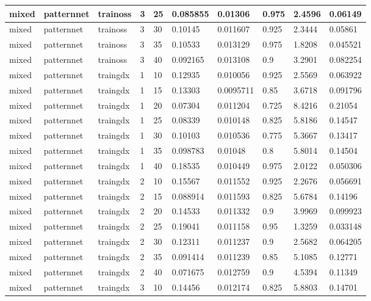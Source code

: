 \begin{longtable}{lllllllll}
mixed & patternnet & trainoss & 3 & 25 & 0.085855 & 0.01306 & 0.975 & 2.4596 & 0.06149 \\ \hline 
mixed & patternnet & trainoss & 3 & 30 & 0.10145 & 0.011607 & 0.925 & 2.3444 & 0.05861 \\ \hline 
mixed & patternnet & trainoss & 3 & 35 & 0.10533 & 0.013129 & 0.975 & 1.8208 & 0.045521 \\ \hline 
mixed & patternnet & trainoss & 3 & 40 & 0.092165 & 0.013108 & 0.9 & 3.2901 & 0.082254 \\ \hline 
mixed & patternnet & traingdx & 1 & 10 & 0.12935 & 0.010056 & 0.925 & 2.5569 & 0.063922 \\ \hline 
mixed & patternnet & traingdx & 1 & 15 & 0.13303 & 0.0095711 & 0.85 & 3.6718 & 0.091796 \\ \hline 
mixed & patternnet & traingdx & 1 & 20 & 0.07304 & 0.011204 & 0.725 & 8.4216 & 0.21054 \\ \hline 
mixed & patternnet & traingdx & 1 & 25 & 0.08339 & 0.010148 & 0.825 & 5.8186 & 0.14547 \\ \hline 
mixed & patternnet & traingdx & 1 & 30 & 0.10103 & 0.010536 & 0.775 & 5.3667 & 0.13417 \\ \hline 
mixed & patternnet & traingdx & 1 & 35 & 0.098783 & 0.01048 & 0.8 & 5.8014 & 0.14504 \\ \hline 
mixed & patternnet & traingdx & 1 & 40 & 0.18535 & 0.010449 & 0.975 & 2.0122 & 0.050306 \\ \hline 
mixed & patternnet & traingdx & 2 & 10 & 0.15567 & 0.011552 & 0.925 & 2.2676 & 0.056691 \\ \hline 
mixed & patternnet & traingdx & 2 & 15 & 0.088914 & 0.011593 & 0.825 & 5.6784 & 0.14196 \\ \hline 
mixed & patternnet & traingdx & 2 & 20 & 0.14533 & 0.011332 & 0.9 & 3.9969 & 0.099923 \\ \hline 
mixed & patternnet & traingdx & 2 & 25 & 0.19041 & 0.011158 & 0.95 & 1.3259 & 0.033148 \\ \hline 
mixed & patternnet & traingdx & 2 & 30 & 0.12311 & 0.011237 & 0.9 & 2.5682 & 0.064205 \\ \hline 
mixed & patternnet & traingdx & 2 & 35 & 0.091414 & 0.011239 & 0.85 & 5.1085 & 0.12771 \\ \hline 
mixed & patternnet & traingdx & 2 & 40 & 0.071675 & 0.012759 & 0.9 & 4.5394 & 0.11349 \\ \hline 
mixed & patternnet & traingdx & 3 & 10 & 0.14456 & 0.012174 & 0.825 & 5.8803 & 0.14701 \\ \hline 

\end{longtable}
